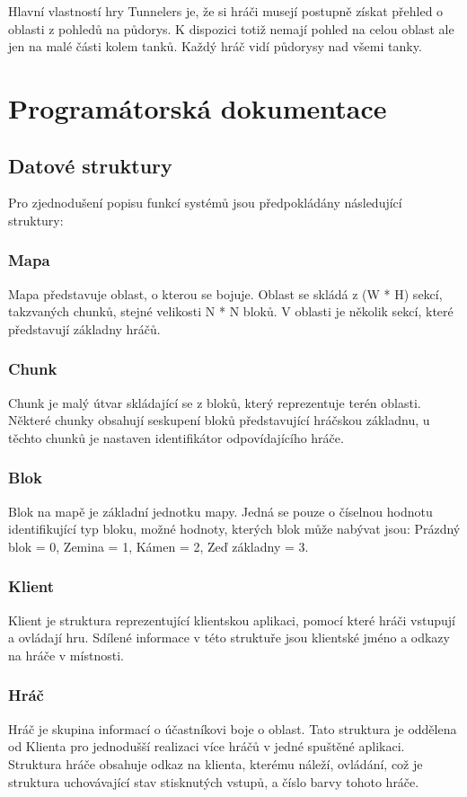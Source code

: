 \documentclass[12pt,a4paper]{article}
\let\oldsection\section
\renewcommand\section{\clearpage\oldsection}
\begin{document}
Hlavní vlastností hry Tunnelers je, že si hráči musejí postupně získat přehled o oblasti z pohledů na půdorys. K dispozici totiž nemají pohled na celou oblast ale jen na malé části kolem tanků. Každý hráč vidí půdorysy nad všemi tanky.


\section{Programátorská dokumentace}
\subsection{Datové struktury}
Pro zjednodušení popisu funkcí systémů jsou předpokládány následující struktury:
\subsubsection*{Mapa}
Mapa představuje oblast, o kterou se bojuje. Oblast se skládá z (W * H) sekcí, takzvaných chunků, stejné velikosti N * N bloků. V oblasti je několik sekcí, které představují základny hráčů.
\subsubsection*{Chunk}
Chunk je malý útvar skládající se z bloků, který reprezentuje terén oblasti. Některé chunky obsahují seskupení bloků představující hráčskou základnu, u těchto chunků je nastaven identifikátor odpovídajícího hráče.
\subsubsection*{Blok}
Blok na mapě je základní jednotku mapy. Jedná se pouze o číselnou hodnotu identifikující typ bloku, možné hodnoty, kterých blok může nabývat jsou: Prázdný blok = 0, Zemina = 1, Kámen = 2, Zeď základny = 3.
\subsubsection*{Klient}
Klient je struktura reprezentující klientskou aplikaci, pomocí které hráči vstupují a ovládají hru. Sdílené informace v této struktuře jsou klientské jméno a odkazy na hráče v místnosti.
\subsubsection*{Hráč}
Hráč je skupina informací o účastníkovi boje o oblast. Tato struktura je oddělena od Klienta pro jednodušší realizaci více hráčů v jedné spuštěné aplikaci. Struktura hráče obsahuje odkaz na klienta, kterému náleží, ovládání, což je struktura uchovávající stav stisknutých vstupů, a číslo barvy tohoto hráče.
\end{document}
